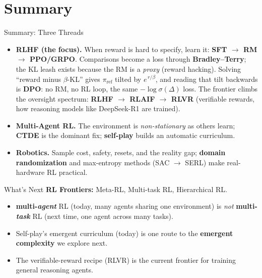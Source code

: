 \section{Summary}

\begin{frame}{Summary: Three Threads}
\begin{itemize}\itemsep0.45em
    \item \textbf{RLHF (the focus).} When reward is hard to specify, learn it:
          \textbf{SFT $\rightarrow$ RM $\rightarrow$ PPO/GRPO}. Comparisons become a
          loss through \textbf{Bradley--Terry}; the KL leash exists because the RM is
          a \emph{proxy} (reward hacking). Solving ``reward minus $\beta$-KL'' gives
          $\pi_{\text{ref}}$ tilted by $e^{\,r/\beta}$, and reading that tilt
          backwards is \textbf{DPO}: no RM, no RL loop, the same
          $-\log\sigma(\Delta)$ loss. The frontier climbs the oversight spectrum:
          \textbf{RLHF $\rightarrow$ RLAIF $\rightarrow$ RLVR} (verifiable rewards,
          how reasoning models like DeepSeek-R1 are trained).
    \item \textbf{Multi-Agent RL.} The environment is \emph{non-stationary} as
          others learn; \textbf{CTDE} is the dominant fix; \textbf{self-play}
          builds an automatic curriculum.
    \item \textbf{Robotics.} Sample cost, safety, resets, and the reality gap;
          \textbf{domain randomization} and max-entropy methods (SAC $\to$ SERL)
          make real-hardware RL practical.
\end{itemize}
\end{frame}

\begin{frame}{What's Next}
\textbf{RL Frontiers:} Meta-RL, Multi-task RL, Hierarchical RL.
\begin{itemize}\itemsep0.4em
    \item {} \textbf{multi-\emph{agent}} RL (today, many
          agents sharing one environment) is \emph{not} \textbf{multi-\emph{task}}
          RL (next time, one agent across many tasks).
    \item Self-play's emergent curriculum (today) is one route to the
          \textbf{emergent complexity} we explore next.
    \item The verifiable-reward recipe (RLVR) is the current frontier for training
          general reasoning agents.
\end{itemize}
\end{frame}
